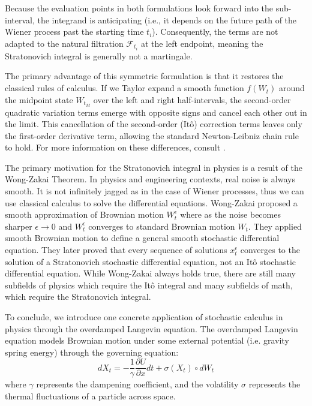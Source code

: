 \documentclass[12pt]{article}
\theoremstyle{definition}
\theoremstyle{plain}
\theoremstyle{remark}
\begin{document}
Because the evaluation points in both formulations look forward into the sub-interval, the integrand is anticipating (i.e., it depends on the future path of the Wiener process past the starting time $t_i$). Consequently, the terms are not adapted to the natural filtration $\mathcal{F}_{t_i}$ at the left endpoint, meaning the Stratonovich integral is generally not a martingale. 

The primary advantage of this symmetric formulation is that it restores the classical rules of calculus. If we Taylor expand a smooth function $f(W_t)$ around the midpoint state $W_{t_M}$ over the left and right half-intervals, the second-order quadratic variation terms emerge with opposite signs and cancel each other out in the limit. This cancellation of the second-order (It\^o) correction terms leaves only the first-order derivative term, allowing the standard Newton-Leibniz chain rule to hold. For more information on these differences, consult \cite{Stratonovich1, Stratonovich2}.

The primary motivation for the Stratonovich integral in physics is a result of the Wong-Zakai Theorem.  In physics and engineering contexts, real noise is always smooth.  It is not infinitely jagged as in the case of Wiener processes, thus we can use classical calculus to solve the differential equations.  Wong-Zakai proposed a smooth approximation of Brownian motion $W_t^{\epsilon}$ where as the noise becomes sharper $\epsilon \to 0$ and $W_t^{\epsilon}$ converges to standard Brownian motion $W_t$.  They applied smooth Brownian motion to define a general smooth stochastic differential equation.  They later proved that every sequence of solutions $x_t^\epsilon$ converges to the solution of a Stratonovich stochastic differential equation, not an It\^o stochastic differential equation.  While Wong-Zakai always holds true, there are still many subfields of physics which require the It\^o integral and many subfields of math, which require the Stratonovich integral.

To conclude, we introduce one concrete application of stochastic calculus in physics through the overdamped Langevin equation.  The overdamped Langevin equation models Brownian motion under some external potential (i.e. gravity spring energy) through the governing equation:
\[
dX_t = -\frac{1}{\gamma} \frac{\partial U}{\partial x} dt + \sigma(X_t) \circ dW_t
\]
where $\gamma$ represents the dampening coefficient, and the volatility $\sigma$ represents the thermal fluctuations of a particle across space.
\end{document}
